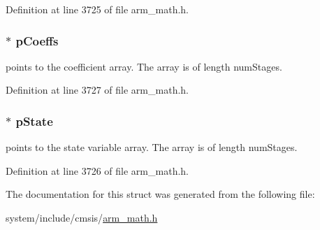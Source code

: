 Definition at line 3725 of file arm\+\_\+math.\+h.

\subsubsection[{\texorpdfstring{p\+Coeffs}{pCoeffs}}]{$\ast$ p\+Coeffs}\hypertarget{structarm__fir__lattice__instance__q15_a7ca181a37f714d174445f486bebce26f}{}\label{structarm__fir__lattice__instance__q15_a7ca181a37f714d174445f486bebce26f}
points to the coefficient array. The array is of length num\+Stages. 

Definition at line 3727 of file arm\+\_\+math.\+h.

\subsubsection[{\texorpdfstring{p\+State}{pState}}]{$\ast$ p\+State}\hypertarget{structarm__fir__lattice__instance__q15_ae29dfdb736374fcddaeaec4b7770170c}{}\label{structarm__fir__lattice__instance__q15_ae29dfdb736374fcddaeaec4b7770170c}
points to the state variable array. The array is of length num\+Stages. 

Definition at line 3726 of file arm\+\_\+math.\+h.



The documentation for this struct was generated from the following file\+:\begin{DoxyCompactItemize}
\item 
system/include/cmsis/\hyperlink{arm__math_8h}{arm\+\_\+math.\+h}\end{DoxyCompactItemize}
